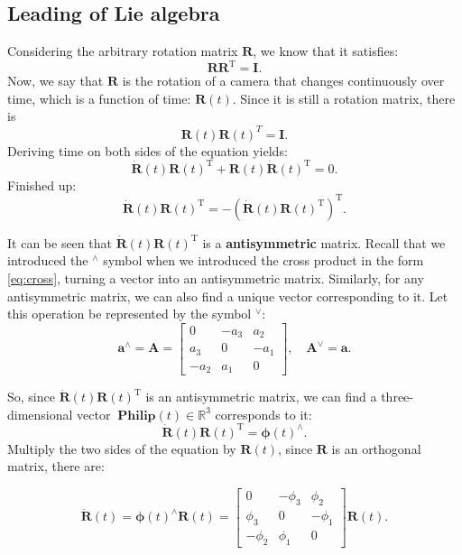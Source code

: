 \subsection{Leading of Lie algebra}

Considering the arbitrary rotation matrix $\bm{R}$, we know that it satisfies:
\begin{equation}
\bm{R} \bm{R}^\mathrm{T}=\bm{I}.
\end{equation}
Now, we say that $\bm{R}$ is the rotation of a camera that changes continuously over time, which is a function of time: $\bm{R}(t)$. Since it is still a rotation matrix, there is
\[
\bm{R}(t) \bm{R}(t) ^T = \bm{I}.
\]
Deriving time on both sides of the equation yields:
\[
\bm{\dot{R}} (t) \bm{R} {(t)^\mathrm{T}} + \bm{R} (t) \bm{\dot{R}} {(t) ^\mathrm{T}} = 0.
\]
Finished up:
\begin{equation}
\bm{\dot{R}} (t) \bm{R} {(t)^\mathrm{T}} = - \left( \bm{\dot{R}} (t) \bm{R} {(t)^\mathrm{T}} \right)^\mathrm{T} .
\end{equation}

It can be seen that $\bm{\dot{R}} (t) \bm{R} {(t)^\mathrm{T}}$ is a \textbf{antisymmetric} matrix. Recall that we introduced the $^\wedge$ symbol when we introduced the cross product in the form \eqref{eq:cross}, turning a vector into an antisymmetric matrix. Similarly, for any antisymmetric matrix, we can also find a unique vector corresponding to it. Let this operation be represented by the symbol $^{\vee}$:
\begin{equation}
{\bm{a}^ \wedge } = \bm{A} = \left[ {\begin{array}{*{20}{c}}
0&{ - {a_3}}&{{a_2}}\\
{{a_3}}&0&{ - {a_1}}\\
{ - {a_2}}&{{a_1}}&0
\end{array}} \right], \quad
{ \bm{A}^ \vee } = \bm{a}.
\end{equation}

So, since $\bm{\dot{R}} (t) \bm{R} {(t)^\mathrm{T}}$ is an antisymmetric matrix, we can find a three-dimensional vector $\boldsymbol{\ Philip} (t) \in \mathbb{R}^3$ corresponds to it:
\[
\bm{ \dot{R} } (t) \bm{R}(t)^\mathrm{T} = \boldsymbol{\phi} (t) ^ {\wedge}.
\]
Multiply the two sides of the equation by $\bm{R}(t)$, since $\bm{R}$ is an orthogonal matrix, there are:

\begin{equation}
\label{eq:dR}
\bm{ \dot{R} } (t) = \boldsymbol{\phi} (t)^{\wedge} \bm{R}(t) =
\left[ {\begin{array}{*{20}{c}}
0&{ - {\phi _3}}&{{\phi _2}}\\
{{\phi _3}}&0&{ - {\phi _1}}\\
{ - {\phi _2}}&{{\phi _1}}&0
\end{array}} \right] \bm{R} (t).
\end{equation}


